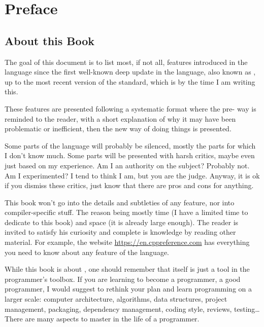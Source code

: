 \chapter{Preface}
\renewcommand*\thesection{\arabic{section}}

\section{About this Book}
The goal of this document is to list most, if not all, features
introduced in the \cpp language since the first well-known deep update
in the language, also known as , up to the most recent version
of the standard, which is  by the time I am writing this.

These features are presented following a systematic format where the
pre- way is reminded to the reader, with a short explanation of
why it may have been problematic or inefficient, then the new way of
doing things is presented.

Some parts of the language will probably be silenced, mostly the parts
for which I don't know much. Some parts will be presented with harsh
critics, maybe even just based on my experience. Am I an authority on
the subject? Probably not. Am I experimented? I tend to think I am,
but you are the judge. Anyway, it is ok if you dismiss these critics,
just know that there are pros and cons for anything.

This book won't go into the details and subtleties of any feature, nor
into compiler-specific stuff. The reason being mostly time (I have a
limited time to dedicate to this book) and space (it is already large
enough). The reader is invited to satisfy his curiosity and complete
is knowledge by reading other material. For example, the website
\url{https://en.cppreference.com} has everything you need to know
about any feature of the language.

\bigskip

While this book is about \cpp, one should remember that \cpp{} itself
is just a tool in the programmer's toolbox. If you are learning \cpp{}
to become a programmer, a good programmer, I would suggest to rethink
your plan and learn programming on a larger scale: computer
architecture, algorithms, data structures, project management,
packaging, dependency management, coding style, reviews, testing…
There are many aspects to master in the life of a programmer.

